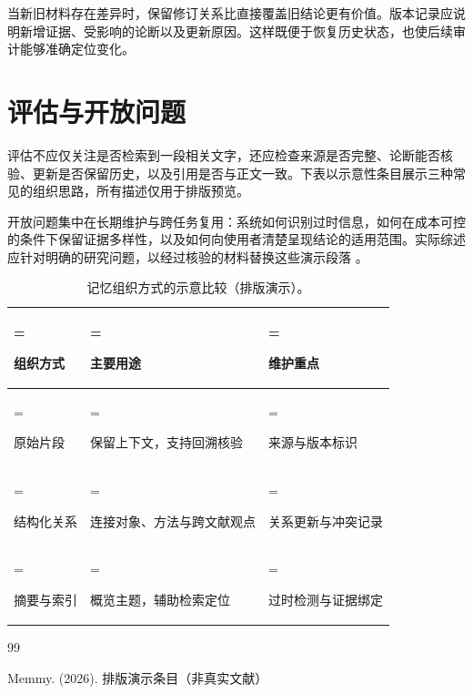 \documentclass[11pt]{article}
\begin{document}
当新旧材料存在差异时，保留修订关系比直接覆盖旧结论更有价值。版本记录应说明新增证据、受影响的论断以及更新原因。这样既便于恢复历史状态，也使后续审计能够准确定位变化。

\section{评估与开放问题}

评估不应仅关注是否检索到一段相关文字，还应检查来源是否完整、论断能否核验、更新是否保留历史，以及引用是否与正文一致。下表以示意性条目展示三种常见的组织思路，所有描述仅用于排版预览。

开放问题集中在长期维护与跨任务复用：系统如何识别过时信息，如何在成本可控的条件下保留证据多样性，以及如何向使用者清楚呈现结论的适用范围。实际综述应针对明确的研究问题，以经过核验的材料替换这些演示段落 \cite{LayoutDemo2026}。

\begin{table}[H]
\centering
\small
\caption{记忆组织方式的示意比较（排版演示）。}
\label{tab:comparison-block}
\begin{tabularx}{\linewidth}{>{\hsize=0.633\hsize\linewidth=\hsize\raggedright\arraybackslash}X >{\hsize=1.267\hsize\linewidth=\hsize\raggedright\arraybackslash}X >{\hsize=1.100\hsize\linewidth=\hsize\raggedright\arraybackslash}X}
\toprule
\rowcolor{MemmyTint} \textbf{组织方式} & \textbf{主要用途} & \textbf{维护重点} \\
\midrule
原始片段 & 保留上下文，支持回溯核验 & 来源与版本标识 \\
结构化关系 & 连接对象、方法与跨文献观点 & 关系更新与冲突记录 \\
摘要与索引 & 概览主题，辅助检索定位 & 过时检测与证据绑定 \\
\bottomrule
\end{tabularx}
\end{table}

\begin{thebibliography}{99}
\small
\raggedright
\setlength{\itemsep}{0.18em}
\setlength{\parsep}{0pt}
 Memmy. (2026). 排版演示条目（非真实文献）
\end{thebibliography}
\end{document}
